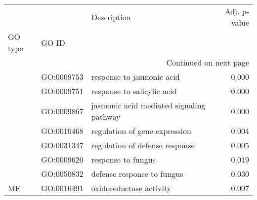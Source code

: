 \begin{longtable}{lllr}
\toprule
   &            &                               Description &  Adj. p-value \\
GO type & GO ID &                                           &               \\
\midrule
\endhead
\midrule
\multicolumn{4}{r}{{Continued on next page}} \\
\midrule
\endfoot

\bottomrule
\endlastfoot
\multirow{7}{*}{BP} & GO:0009753 &                 response to jasmonic acid &         0.000 \\
   & GO:0009751 &                response to salicylic acid &         0.000 \\
   & GO:0009867 &  jasmonic acid mediated signaling pathway &         0.000 \\
   & GO:0010468 &             regulation of gene expression &         0.004 \\
   & GO:0031347 &            regulation of defense response &         0.005 \\
   & GO:0009620 &                        response to fungus &         0.019 \\
   & GO:0050832 &                defense response to fungus &         0.030 \\
\cline{1-4}
MF & GO:0016491 &                   oxidoreductase activity &         0.007 \\
\end{longtable}
